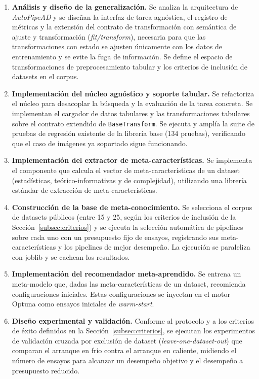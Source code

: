 \documentclass[12pt,letterpaper]{article}
\begin{document}
\begin{enumerate}
  \item \textbf{Análisis y diseño de la generalización.} Se analiza la arquitectura de \textit{AutoPipeAD} y se diseñan la interfaz de tarea agnóstica, el registro de métricas y la extensión del contrato de transformación con semántica de ajuste y transformación (\textit{fit/transform}), necesaria para que las transformaciones con estado se ajusten únicamente con los datos de entrenamiento y se evite la fuga de información. Se define el espacio de transformaciones de preprocesamiento tabular y los criterios de inclusión de datasets en el corpus.

  \item \textbf{Implementación del núcleo agnóstico y soporte tabular.} Se refactoriza el núcleo para desacoplar la búsqueda y la evaluación de la tarea concreta. Se implementan el cargador de datos tabulares y las transformaciones tabulares sobre el contrato extendido de \texttt{BaseTransform}. Se ejecuta y amplía la suite de pruebas de regresión existente de la librería base (134 pruebas), verificando que el caso de imágenes ya soportado sigue funcionando.

  \item \textbf{Implementación del extractor de meta-características.} Se implementa el componente que calcula el vector de meta-características de un dataset (estadísticas, teórico-informativas y de complejidad), utilizando una librería estándar de extracción de meta-características.

  \item \textbf{Construcción de la base de meta-conocimiento.} Se selecciona el corpus de datasets públicos (entre 15 y 25, según los criterios de inclusión de la Sección~\ref{subsec:criterios}) y se ejecuta la selección automática de pipelines sobre cada uno con un presupuesto fijo de ensayos, registrando sus meta-características y los pipelines de mejor desempeño. La ejecución se paraleliza con joblib y se cachean los resultados.

  \item \textbf{Implementación del recomendador meta-aprendido.} Se entrena un meta-modelo que, dadas las meta-características de un dataset, recomienda configuraciones iniciales. Estas configuraciones se inyectan en el motor Optuna como ensayos iniciales de \textit{warm-start}.

  \item \textbf{Diseño experimental y validación.} Conforme al protocolo y a los criterios de éxito definidos en la Sección~\ref{subsec:criterios}, se ejecutan los experimentos de validación cruzada por exclusión de dataset (\textit{leave-one-dataset-out}) que comparan el arranque en frío contra el arranque en caliente, midiendo el número de ensayos para alcanzar un desempeño objetivo y el desempeño a presupuesto reducido.


\end{enumerate}
\end{document}
